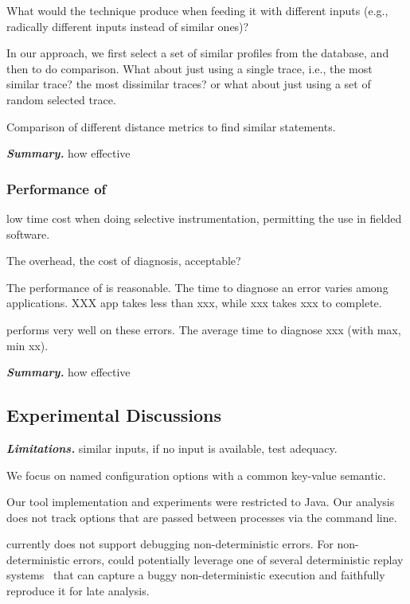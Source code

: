 What would the technique produce when feeding it with different inputs (e.g.,
radically different inputs instead of similar ones)?

In our approach, we first select a set of similar profiles from the  database,
and then to do comparison. What about just using a single trace, i.e., the
most similar trace? the most dissimilar traces? or what about just using a set
of random selected trace.

Comparison of different distance metrics to find similar statements.

\vspace{1mm}
\noindent \textbf{\textit{Summary.}} how effective

\subsubsection{Performance of \ourtool}
low time cost when doing
selective instrumentation, permitting the use in fielded software.

The overhead, the cost of diagnosis, acceptable?

The performance of \ourtool is reasonable. The time to diagnose
an error varies among applications.  XXX app takes less than xxx,
while xxx takes xxx to complete.

\ourtool performs very well on these errors. The average time
to diagnose xxx (with max, min xx).

\vspace{1mm}
\noindent \textbf{\textit{Summary.}} how effective

\vspace{1mm}

\subsection{Experimental Discussions}


\noindent \textbf{\textit{Limitations.}} similar inputs, if no input is available, test adequacy.

We focus on named configuration options with a common key-value semantic.

Our tool implementation and experiments were restricted to Java. Our analysis
does not track options that are passed between processes via the command line.

\ourtool currently does not support debugging non-deterministic errors. %
For non-deterministic errors, \ourtool could potentially leverage one of
several deterministic replay systems~\cite{Huang:2010:LLD}
that can capture a buggy non-deterministic
execution and faithfully reproduce it for late analysis.

